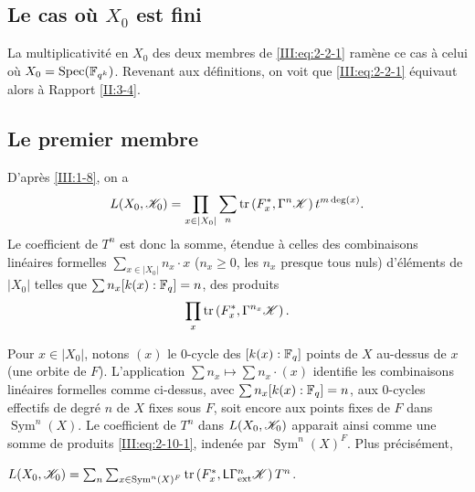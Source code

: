 \subsection{Le cas où $X_0$ est fini}\label{III:2-9}

La multiplicativité en $X_0$ des deux membres de \eqref{III:eq:2-2-1} 
ramène ce cas à celui où $X_0=\operatorname{Spec}(\mathbb{F}_{q^k})$. Revenant aux 
définitions, on voit que \eqref{III:eq:2-2-1} équivaut alors à 
Rapport \ref{II:3-4}. 





\subsection{Le premier membre}\label{III:2-10}

D'après \ref{III:1-8}, on a 
\[
  L(X_0,\mathscr{K}_0) = \prod_{x\in |X_0|} \sum_n \operatorname{tr}\left(F_x^*,\Gamma^n\mathscr{K}\right) t^{m\deg(x)} \text{.}
\]
Le coefficient de $T^n$ est donc la somme, étendue à celles des 
combinaisons linéaires formelles $\sum_{x\in |X_0|} n_x\cdot x$ 
($n_x\geqslant 0$, les $n_x$ presque tous nuls) d'éléments de $|X_0|$ 
telles que $\sum n_x [k(x):\mathbb{F}_q] = n$, des produits 
\begin{equation}\label{III:eq:2-10-1}
  \prod_x \operatorname{tr}\left(F_x^*,\Gamma^{n_x} \mathscr{K}\right) \text{.}
\end{equation}

Pour $x\in |X_0|$, notons $(x)$ le $0$-cycle des $[k(x):\mathbb{F}_q]$ points de $X$ 
au-dessus de $x$ (une orbite de $F$). L'application 
$\sum n_x\mapsto \sum n_x\cdot (x)$ identifie les combinaisons linéaires 
formelles comme ci-dessus, avec $\sum n_x [k(x):\mathbb{F}_q]=n$, aux $0$-cycles 
effectifs de degré $n$ de $X$ fixes sous $F$, soit encore aux points fixes de 
$F$ dans $\operatorname{Sym}^n(X)$. Le coefficient de $T^n$ dans $L(X_0,\mathscr{K}_0)$ 
apparait ainsi comme une somme de produits \eqref{III:eq:2-10-1}, indenée 
par $\operatorname{Sym}^n(X)^F$. Plus précisément, 





\begin{lemma_}\label{III:2-11}
 $L(X_0,\mathscr{K}_0) = \sum_n \sum_{x\in\operatorname{Sym}^n(X)^F} \operatorname{tr}\left(F_x^*,\mathsf{L}\Gamma_\textnormal{ext}^n \mathscr{K}\right) T^n$.
\end{lemma_}


